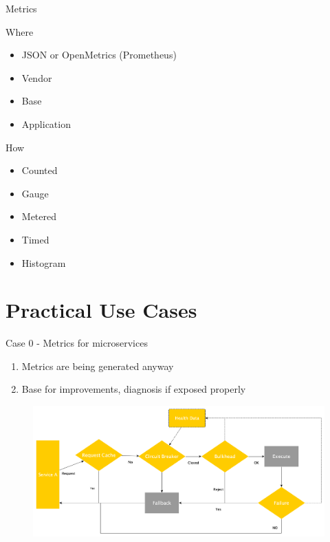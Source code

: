 \documentclass{beamer}
\begin{document}
\begin{frame}{Metrics}

Where
\begin{itemize}
	\item JSON or OpenMetrics (Prometheus)
	\item Vendor
	\item Base
	\item Application
\end{itemize}

How
\begin{itemize}
	\item Counted
	\item Gauge
	\item Metered
	\item Timed
	\item Histogram
\end{itemize}

\end{frame}


\section{Practical Use Cases}


\begin{frame}{Case 0 - Metrics for microservices}

\begin{enumerate}
	\item Metrics are being generated anyway
	\item Base for improvements, diagnosis if exposed properly
\end{enumerate}

\begin{figure}
	\centering
	\includegraphics[width=\linewidth]{Images/falldata}
\end{figure}

\end{frame}
\end{document}
